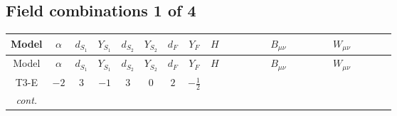 \documentclass[8pt]{article}
\begin{document}
\begin{landscape}
\subsection*{Field combinations 1 of 4}
\begin{longtable}{@{}cccccccc >{\raggedright\arraybackslash}p{0.21\linewidth} >{\raggedright\arraybackslash}p{0.21\linewidth} >{\raggedright\arraybackslash}p{0.21\linewidth}@{}}
\toprule
Model & $\alpha$ & $d_{S_1}$ & $Y_{S_1}$ & $d_{S_2}$ & $Y_{S_2}$ & $d_F$ & $Y_F$ & $H$ & $B_{\mu\nu}$ & $W_{\mu\nu}$ \\
\midrule
\endfirsthead
\toprule
Model & $\alpha$ & $d_{S_1}$ & $Y_{S_1}$ & $d_{S_2}$ & $Y_{S_2}$ & $d_F$ & $Y_F$ & $H$ & $B_{\mu\nu}$ & $W_{\mu\nu}$ \\
\midrule
\endhead
T3-E & $-2$ & $3$ & $-1$ & $3$ & $0$ & $2$ & $-\frac{1}{2}$ & \scriptsize\adjustbox{max width=\linewidth}{$\begin{gathered} +C_{\text{H2}} H_{a_1} H_{a_1}{}^{\dagger } \\ -H_{a_1} \mu ^2 H_{a_1}{}^{\dagger } \\ +\frac{2 \hbar  \overline{\lambda_5} H_{a_1} H_{a_2} \lambda_5 H_{a_1}{}^{\dagger } H_{a_2}{}^{\dagger }}{\epsilon }\end{gathered}$} & \scriptsize\adjustbox{max width=\linewidth}{$\begin{gathered} -\frac{3 \hbar  B_{\mu _1\mu _2}^2}{4 \epsilon } \\ -\frac{1}{4} \hbar  \log \left(\frac{\bar{\mu}^{2}}{m_1^2}\right) B_{\mu _1\mu _2}^2\end{gathered}$} & \scriptsize\adjustbox{max width=\linewidth}{$\begin{gathered} -\frac{5 \hbar  \left(W_{\mu _1\mu _2}^{A_1}\right){}^2}{6 \epsilon } \\ -\frac{1}{6} \hbar  \log \left(\frac{\bar{\mu}^{2}}{m_1^2}\right) \left(W_{\mu _1\mu _2}^{A_1}\right){}^2 \\ -\frac{1}{6} \hbar  \log \left(\frac{\bar{\mu}^{2}}{m_2^2}\right) \left(W_{\mu _1\mu _2}^{A_1}\right){}^2\end{gathered}$} \\
\textit{cont.} &  &  &  &  &  &  &  & \scriptsize\adjustbox{max width=\linewidth}{$\begin{gathered} +\frac{2 \hbar  \overline{\lambda_5} H_{a_1} H_{a_2} m_1^2 \lambda_5 H_{a_1}{}^{\dagger } H_{a_2}{}^{\dagger }}{m_1^2-m_2^2} \\ +\frac{2 \hbar  \log \left(\frac{\bar{\mu}^{2}}{m_1^2}\right) \overline{\lambda_5} H_{a_1} H_{a_2} m_1^2 \lambda_5 H_{a_1}{}^{\dagger } H_{a_2}{}^{\dagger }}{m_1^2-m_2^2} \\ -\frac{2 \hbar  \overline{\lambda_5} H_{a_1} H_{a_2} m_2^2 \lambda_5 H_{a_1}{}^{\dagger } H_{a_2}{}^{\dagger }}{m_1^2-m_2^2}\end{gathered}$} &  &  \\

\end{longtable}
\end{landscape}
\end{document}
